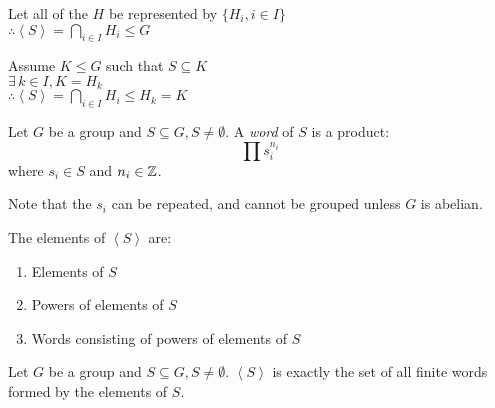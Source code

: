 \documentclass[letterpaper,12pt,fleqn]{article}
\newcommand{\cycle}[1]{\left<#1\right>}
\begin{document}
\begin{theproof}
  Let all of the $H$ be represented by $\{H_i,i\in I\}$ \\
  $\therefore\cycle{S}=\bigcap_{i\in I}H_i\le G$

  Assume $K\le G$ such that $S\subseteq K$ \\
  $\exists\,k\in I,K=H_k$ \\
  $\therefore\cycle{S}=\bigcap_{i\in I}H_i\le H_k=K$
\end{theproof}

\begin{definition}
  Let $G$ be a group and $S\subseteq G,S\ne\emptyset$. A \emph{word} of $S$ is
  a product:
  \[\prod s_i^{n_i}\]
  where $s_i\in S$ and $n_i\in\mathbb{Z}$.

  Note that the $s_i$ can be repeated, and cannot be grouped unless $G$ is
  abelian.
\end{definition}

The elements of $\cycle{S}$ are:
\begin{enumerate}
\item Elements of $S$
\item Powers of elements of $S$
\item Words consisting of powers of elements of $S$
\end{enumerate}

\begin{theorem}
  Let $G$ be a group and $S\subseteq G,S\ne\emptyset$. $\cycle{S}$ is exactly
  the set of all finite words formed by the elements of $S$.
\end{theorem}
\end{document}
